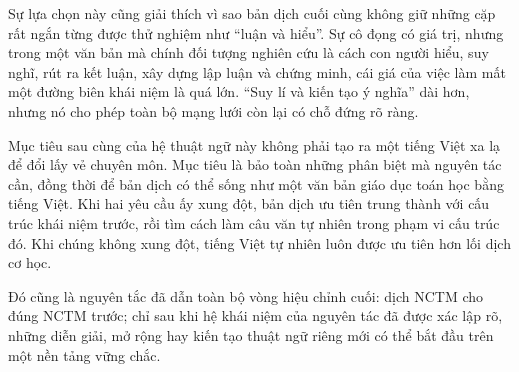 Sự lựa chọn này cũng giải thích vì sao bản dịch cuối cùng không giữ những cặp rất ngắn từng được thử nghiệm như ``luận và hiểu''. Sự cô đọng có giá trị, nhưng trong một văn bản mà chính đối tượng nghiên cứu là cách con người hiểu, suy nghĩ, rút ra kết luận, xây dựng lập luận và chứng minh, cái giá của việc làm mất một đường biên khái niệm là quá lớn. ``Suy lí và kiến tạo ý nghĩa'' dài hơn, nhưng nó cho phép toàn bộ mạng lưới còn lại có chỗ đứng rõ ràng.

Mục tiêu sau cùng của hệ thuật ngữ này không phải tạo ra một tiếng Việt xa lạ để đổi lấy vẻ chuyên môn. Mục tiêu là bảo toàn những phân biệt mà nguyên tác cần, đồng thời để bản dịch có thể sống như một văn bản giáo dục toán học bằng tiếng Việt. Khi hai yêu cầu ấy xung đột, bản dịch ưu tiên trung thành với cấu trúc khái niệm trước, rồi tìm cách làm câu văn tự nhiên trong phạm vi cấu trúc đó. Khi chúng không xung đột, tiếng Việt tự nhiên luôn được ưu tiên hơn lối dịch cơ học.

Đó cũng là nguyên tắc đã dẫn toàn bộ vòng hiệu chỉnh cuối: dịch NCTM cho đúng NCTM trước; chỉ sau khi hệ khái niệm của nguyên tác đã được xác lập rõ, những diễn giải, mở rộng hay kiến tạo thuật ngữ riêng mới có thể bắt đầu trên một nền tảng vững chắc.

\endgroup
